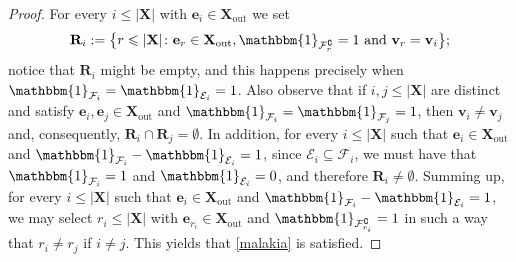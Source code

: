 \documentclass[11pt,leqno]{amsart}
\theoremstyle{remark}
\theoremstyle{plain}
\begin{document}
\begin{proof}
For every $i\leqslant |\mathbf{X}|$ with $\mathbf{e}_i\in \mathbf{X}_\mathrm{out}$ we set
\[ \mathbf{R}_i:=\big\{ r\leqslant |\mathbf{X}|\colon \mathbf{e}_r\in \mathbf{X}_\mathrm{out},
\mathbbm{1}_{\mathcal{F}_r^{\complement}}=1 \text{ and } \mathbf{v}_r=\mathbf{v}_i\big\}; \]
notice that $\mathbf{R}_i$ might be empty, and this happens precisely when
$\mathbbm{1}_{\mathcal{F}_i}=\mathbbm{1}_{\mathcal{E}_i}=1$. Also observe that
if $i,j\leqslant |\mathbf{X}|$ are distinct and satisfy $\mathbf{e}_i,\mathbf{e}_j\in \mathbf{X}_\mathrm{out}$ and
$\mathbbm{1}_{\mathcal{F}_i}=\mathbbm{1}_{\mathcal{F}_j}=1$, then $\mathbf{v}_i\neq \mathbf{v}_j$ and, consequently,
$\mathbf{R}_i\cap \mathbf{R}_j=\emptyset$. In addition, for every $i\leqslant |\mathbf{X}|$ such that
$\mathbf{e}_i\in \mathbf{X}_\mathrm{out}$ and $\mathbbm{1}_{\mathcal{F}_i}-\mathbbm{1}_{\mathcal{E}_i}=1$,
since $\mathcal{E}_i\subseteq \mathcal{F}_i$, we must have that $\mathbbm{1}_{\mathcal{F}_i}=1$ and
$\mathbbm{1}_{\mathcal{E}_i}=0$, and therefore $\mathbf{R}_i\neq\emptyset$.
Summing up, for every $i\leqslant |\mathbf{X}|$ such that $\mathbf{e}_i\in \mathbf{X}_\mathrm{out}$ and
$\mathbbm{1}_{\mathcal{F}_i}-\mathbbm{1}_{\mathcal{E}_i}=1$, we may select $r_i\leqslant |\mathbf{X}|$ with
$\mathbf{e}_{r_i}\in \mathbf{X}_\mathrm{out}$ and $\mathbbm{1}_{\mathcal{F}_{r_i}^{\complement}}=1$ in such a way
that $r_i\neq r_j$ if $i\neq j$. This yields that \eqref{malakia} is satisfied.


\end{proof}
\end{document}
